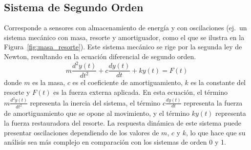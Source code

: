 \subsection{Sistema de Segundo Orden}\label{sec:segundo_orden}
Corresponde a sensores con almacenamiento de energía y  con oscilaciones (ej.\ un sistema mecánico con masa, resorte y amortiguador, como el que se ilustra en la Figura~\ref{fig:masa_resorte}). Este sistema mecánico se rige por la segunda ley de Newton, resultando en la ecuación diferencial de segundo orden. 
\begin{equation}\label{eq:segundo_orden}
m \frac{d^2y(t)}{dt^2} + c \frac{dy(t)}{dt} + ky(t) = F(t)
\end{equation}
donde $m$ es la masa, $c$ es el coeficiente de amortiguamiento, $k$ es la constante del resorte y $F(t)$ es la fuerza externa aplicada. En esta ecuación, el término $m \frac{d^2y(t)}{dt^2}$ representa la inercia del sistema, el término $c \frac{dy(t)}{dt}$ representa la fuerza de amortiguamiento que se opone al movimiento, y el término $ky(t)$ representa la fuerza restauradora del resorte. La respuesta dinámica de este sistema puede presentar oscilaciones dependiendo de los valores de $m$, $c$ y $k$, lo que hace que su análisis sea más complejo en comparación con los sistemas de orden 0 y 1.
%
